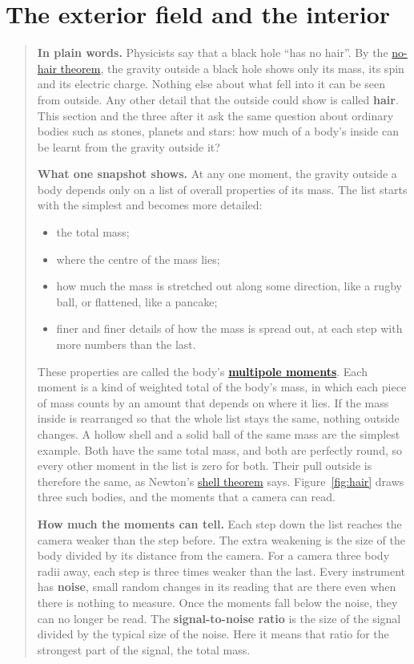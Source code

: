 \section{The exterior field and the interior}\label{sec:hair}

\begin{quote}
\textbf{In plain words.} Physicists say that a black hole ``has no hair''. By
the \href{https://en.wikipedia.org/wiki/No-hair_theorem}{no-hair theorem}, the
gravity outside a black hole shows only its mass, its spin and its electric
charge. Nothing else about what fell into it can be seen from outside. Any
other detail that the outside could show is called \textbf{hair}. This section
and the three after it ask the same question about ordinary bodies such as
stones, planets and stars: how much of a body's inside can be learnt from the
gravity outside it?

\textbf{What one snapshot shows.} At any one moment, the gravity outside a body
depends only on a list of overall properties of its mass. The list starts with
the simplest and becomes more detailed:
\begin{itemize}
\item the total mass;
\item where the centre of the mass lies;
\item how much the mass is stretched out along some direction, like a rugby
ball, or flattened, like a pancake;
\item finer and finer details of how the mass is spread out, at each step
with more numbers than the last.
\end{itemize}
These properties are called the body's
\textbf{\href{https://en.wikipedia.org/wiki/Multipole_expansion}{multipole
moments}}. Each moment is a kind of weighted total of the body's mass, in which
each piece of mass counts by an amount that depends on where it lies. If the
mass inside is rearranged so that the whole list stays the same, nothing
outside changes. A hollow shell and a solid ball of the same mass are the
simplest example. Both have the same total mass, and both are perfectly round,
so every other moment in the list is zero for both. Their pull outside is
therefore the same, as Newton's
\href{https://en.wikipedia.org/wiki/Shell_theorem}{shell theorem} says. Figure~\ref{fig:hair} draws three such bodies, and the moments that a camera can read.

\textbf{How much the moments can tell.} Each step down the list reaches the
camera weaker than the step before. The extra weakening is the size of the
body divided by its distance from the camera. For a camera three body radii
away, each step is three times weaker than the last. Every instrument has
\textbf{noise}, small random changes in its reading that are there even when
there is nothing to measure. Once the moments fall below the noise, they can no
longer be read. The \textbf{signal-to-noise ratio} is the size of the signal
divided by the typical size of the noise. Here it means that ratio for the
strongest part of the signal, the total mass.


\end{quote}
